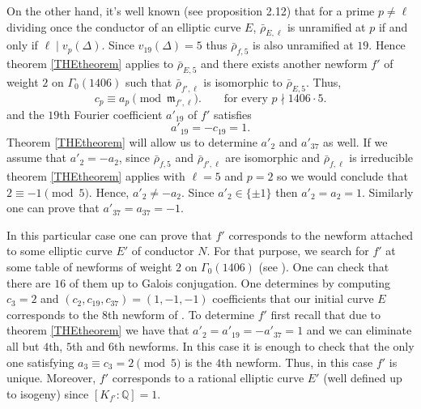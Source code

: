 \documentclass[12pt,reqno]{amsart}
\theoremstyle{plain}
\theoremstyle{definition}
\begin{document}
On the other hand, it's well known (see \cite{DDT} proposition 2.12) that for a prime $p\neq \ell$ dividing once the conductor of an elliptic curve $E$, $\bar\rho_{E,\ell}$ is  unramified at $p$ if and only if $\ell\mid v_{p}(\Delta)$. Since
$
v_{19}(\Delta)=5
$
thus $\bar\rho_{f,5}$ is also unramified at $19$. Hence theorem \ref{THEtheorem} applies to $\bar\rho_{E,5}$ and there exists another newform $f'$ of weight $2$ on $\Gamma_0(1406)$ 
such that $\bar\rho_{f',\ell}$ is isomorphic to $\bar\rho_{E,5}$. Thus, 
$$
c_p \equiv a_p \pmod {\mathfrak m_{f',\ell}}.
\qquad\text{for every $p\nmid 1406\cdot 5$}.
$$
and the $19$th Fourier coefficient $a'_{19}$ of $f'$ satisfies
$$
a'_{19}=-c_{19}=1.
$$
Theorem \ref{THEtheorem} will allow us to determine $a'_2$ and $a'_{37}$ as well. If we assume that $a'_2=-a_2$, since $\bar\rho_{f,5}$ and $\bar\rho_{f',\ell}$ are isomorphic and $\bar\rho_{f,\ell}$ is irreducible theorem \ref{THEtheorem} applies with $\ell=5$ and $p=2$ so we would conclude that $2\equiv -1\pmod 5$. Hence, $a'_2\neq -a_2$. Since $a'_2\in\{\pm 1\}$ then $a'_2 = a_2=1$. Similarly one can prove that $a'_{37}= a_{37}=-1$.

In this particular case one can prove that $f'$ corresponds to the newform attached to some elliptic curve $E'$ of conductor $N$. 
For that purpose, we search for $f'$ at some table of newforms of weight $2$ on $\Gamma_0(1406)$ (see \cite{Stein}). One can check that there are $16$ of them up to Galois conjugation. 
One determines by computing $c_3=2$ and $(c_2,c_{19}, c_{37})=(1,-1,-1)$ coefficients that our initial curve $E$ corresponds to the $8$th newform of \cite{Stein}. 
To determine $f'$ first recall that due to theorem \ref{THEtheorem} we have that $a'_2=a'_{19}=-a'_{37}=1$ and we can eliminate all but $4$th, $5$th and $6$th newforms. 
In this case it is enough to check that the only one satisfying $a_3\equiv c_3=2 \pmod 5$ is the $4$th newform. 
Thus, in this case $f'$ is unique. Moreover, $f'$ corresponds to a rational elliptic curve $E'$ (well defined up to isogeny) since $[K_{f'}:\mathbb Q]=1$.  
\end{document}
